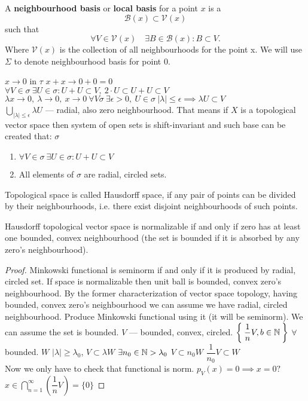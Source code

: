 \begin{defn}
  A \textbf{neighbourhood basis} or \textbf{local basis} for a point $x$ is a 
  \[
    \mathcal{B}(x) \subset \mathcal{V}(x) 
  \]
  such that 
  \[
    \forall V \in \mathcal{V}(x) \quad \exists B \in \mathcal{B}(x): B \subset V.
  \]
  Where $\mathcal{V}(x)$ is the collection of all neighbourhoods for the point
  x.
  We will use $\Sigma$ to denote neighbourhood basis for point 0.
\end{defn}

$x \to 0$ in $\tau$ $x + x \to 0 + 0 = 0$\\
$\forall V \in \sigma\ \exists U \in \sigma \colon U + U \subset V,\ 2 \cdot U
\subset U + U \subset V$ \\
$\lambda x \to 0,\ \lambda \to 0,\ x \to 0\ \forall V \sigma\ \exists \epsilon >
0,\ U \in \sigma\ |\lambda| \leq \epsilon \implies \lambda U \subset V$ \\
$\bigcup\limits_{|\lambda| \leq \epsilon} \lambda U$ --- radial, also zero
neighbourhood. That means if $X$ is a topological vector space then system of open
sets is shift-invariant and such base can be created that:
$\sigma$ 
\begin{enumerate}
\item $\forall V \in \sigma\ \exists U \in \sigma: U + U \subset V$
\item All elements of $\sigma$ are radial, circled sets.
\end{enumerate}

\begin{defn}
  Topological space is called Hausdorff space, if any pair of points can be
  divided by their neighbourhoods, i.e. there exist disjoint neighbourhoods of such points.
\end{defn}

\begin{thm}[Kolmogorov]
  Hausdorff topological vector space is normalizable if and only if zero has at least one 
  bounded, convex neighbourhood (the set is bounded if it is absorbed by any zero's neighbourhood).
\end{thm}

\begin{proof}
  Minkowski functional is seminorm if and only if it is produced by radial,
  circled set. If space is normalizable then unit ball is bounded, convex zero's
  neighbourhood.
  By the former characterization of vector space topology, having bounded, convex zero's
  neighbourhood we can assume we have radial, circled neighbourhood. Produce Minkowski
  functional using it (it will be seminorm). We can assume the set is bounded.
  $V$ --- bounded, convex, circled. $\Set{\dfrac{1}{n}V, b \in \mathbb{N}}$
  $\forall$ bounded.
  $W$ $|\lambda| \geq \lambda_0$, $V \subset \lambda W$
  $\exists n_0 \in \mathbb{N} > \lambda_0$
  $V \subset n_0 W$ $\dfrac{1}{n_0} V \subset W$ \\
  Now we only have to check that functional is norm.
  $p_V(x) = 0 \implies x = 0?$ \\
  $x \in \bigcap\limits_{n = 1}^\infty \left(\dfrac{1}{n} V\right) = \{0\}$
\end{proof}

